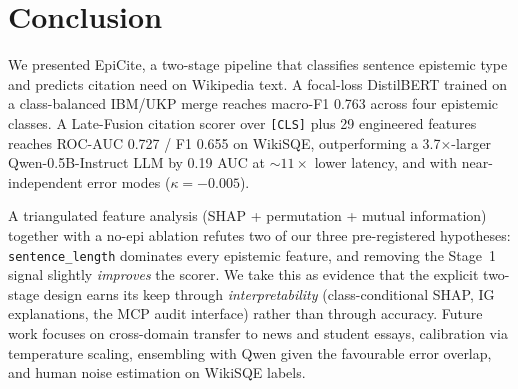 \documentclass[conference]{IEEEtran}
\begin{document}
\section{Conclusion}

We presented EpiCite, a two-stage pipeline that classifies sentence
epistemic type and predicts citation need on Wikipedia text. A
focal-loss DistilBERT trained on a class-balanced IBM/UKP merge reaches
macro-F1 0.763 across four epistemic classes. A Late-Fusion citation
scorer over \texttt{[CLS]} plus 29 engineered features reaches ROC-AUC
0.727 / F1 0.655 on WikiSQE, outperforming a 3.7$\times$-larger
Qwen-0.5B-Instruct LLM by 0.19 AUC at $\sim\!11\times$ lower latency,
and with near-independent error modes ($\kappa{=}-0.005$).

A triangulated feature analysis (SHAP + permutation + mutual information)
together with a no-epi ablation refutes two of our three pre-registered
hypotheses: \texttt{sentence\_length} dominates every epistemic feature,
and removing the Stage~1 signal slightly \emph{improves} the scorer. We
take this as evidence that the explicit two-stage design earns its keep
through \emph{interpretability} (class-conditional SHAP, IG explanations,
the MCP audit interface) rather than through accuracy. Future work
focuses on cross-domain transfer to news and student essays, calibration
via temperature scaling, ensembling with Qwen given the favourable error
overlap, and human noise estimation on WikiSQE labels.
\end{document}
